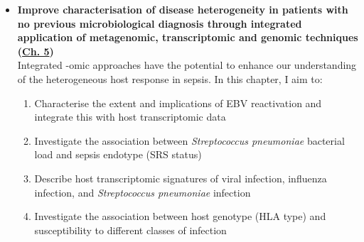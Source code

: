 \begin{itemize}[leftmargin=*]
\item	\textbf{Improve characterisation of disease heterogeneity in patients with no previous microbiological diagnosis through integrated application of metagenomic, transcriptomic and genomic techniques (\hyperref[ch:Results3]{Ch. 5})} \\
Integrated -omic approaches have the potential to enhance our understanding of the heterogeneous host response in sepsis. In this chapter, I aim to:
		\begin{enumerate}
			\item Characterise the extent and implications of EBV reactivation and integrate this with host transcriptomic data
			\item Investigate the association between \textit{Streptococcus pneumoniae} bacterial load and sepsis endotype (SRS status)
			\item Describe host transcriptomic signatures of viral infection, influenza infection, and \textit{Streptococcus pneumoniae} infection
			\item Investigate the association between host genotype (HLA type) and susceptibility to different classes of infection
		\end{enumerate}

		
\end{itemize}







